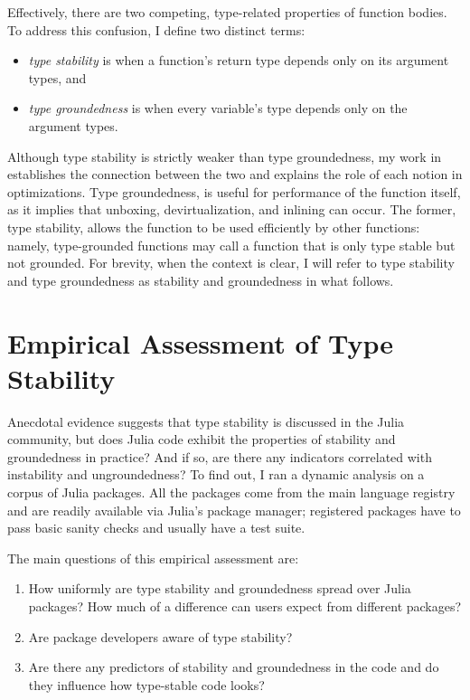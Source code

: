 Effectively, there are two competing, type-related properties of function
bodies. To address this confusion, I define two distinct terms:
\begin{itemize}
  \item \emph{type stability} is when a function's return type depends only on
    its argument types, and
  \item \emph{type groundedness} is when every variable's type depends
    only on the argument types.
\end{itemize}
Although type stability is strictly weaker than type groundedness,
my work in~\cite{Pelenitsyn21} establishes the connection between the two and
explains the role of each notion in optimizations. Type
groundedness, is useful for performance of the function itself, as it implies
that unboxing, devirtualization, and inlining can occur. The former, type
stability, allows the function to be used efficiently by other functions:
namely, type-grounded functions may call a function that is only type stable but
not grounded. For brevity, when the context is clear, I will refer to type
stability and type groundedness as stability and groundedness in what follows.

\section{Empirical Assessment of Type Stability}\label{sec:empirical}

Anecdotal evidence suggests that type stability is discussed in the
Julia community, but does Julia code exhibit the properties of stability
and groundedness in practice? And if so, are there any indicators correlated with
instability and ungroundedness? To find out, I ran a dynamic analysis on a
corpus of Julia packages. All the packages come from the main language registry
and are readily available via Julia's package manager; registered packages have
to pass basic sanity checks and usually have a test suite.

The main questions of this empirical assessment are:
\begin{enumerate}
\item How uniformly are type stability and groundedness spread over Julia packages?
  How much of a difference can users expect from different packages?
\item Are package developers aware of type stability?
\item Are there any predictors of stability and groundedness in the code and do
  they influence how type-stable code looks?
\end{enumerate}

